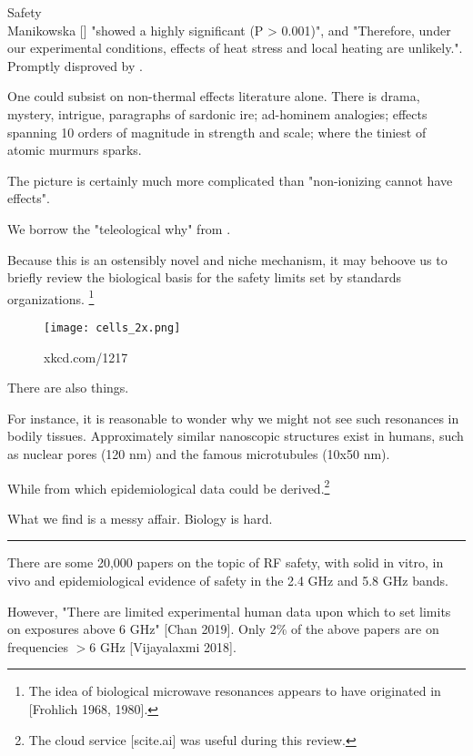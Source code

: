 \documentclass[paper.tex]{subfiles}
\begin{document}
\clearpage
\begin{multicols}{1}
{\Large Safety}\\

Manikowska [] "showed a highly significant (P > 0.001)", and "Therefore, under our experimental conditions, effects of heat stress and local heating are unlikely.". Promptly disproved by \cite{Cytogenetic1986}.




One could subsist on non-thermal effects literature alone. There is drama, mystery, intrigue, paragraphs of sardonic ire; ad-hominem analogies; effects spanning 10 orders of magnitude in strength and scale; where the tiniest of atomic murmurs sparks.

The picture is certainly much more complicated than "non-ionizing cannot have effects".

We borrow the "teleological why" from \cite{mechanisms1981}.

Because this is an ostensibly novel and niche mechanism, it may behoove us to briefly review the biological basis for the safety limits set by standards organizations. \footnote{The idea of biological microwave resonances appears to have originated in [Frohlich 1968, 1980].}



\begin{figure}[H]
	\texttt{[image: cells\_2x.png]}
	\caption{xkcd.com/1217}
\end{figure}



There are also things.

For instance, it is reasonable to wonder why we might not see such resonances in bodily tissues. Approximately similar nanoscopic structures exist in humans, such as nuclear pores (120 nm) and the famous microtubules (10x50 nm). 

While from which epidemiological data could be derived.\footnote{The cloud service [scite.ai] was useful during this review.}

What we find is a messy affair. Biology is hard.

\rule{\linewidth}{0.2pt}

There are some 20,000 papers on the topic of RF safety, with solid in vitro, in vivo and epidemiological evidence of safety in the 2.4 GHz and 5.8 GHz bands.

However, "There are limited experimental human data upon which to set limits on exposures above 6 GHz" [Chan 2019]. Only 2\% of the above papers are on frequencies $>6$ GHz [Vijayalaxmi 2018]. 


\end{multicols}
\end{document}
